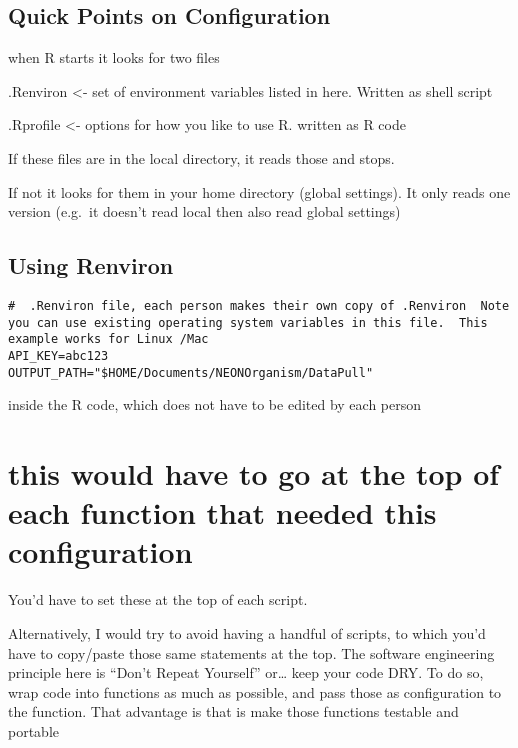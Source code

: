 \documentclass[
]{article}
\begin{document}
\hypertarget{quick-points-on-configuration}{%
\subsection{Quick Points on Configuration}\label{quick-points-on-configuration}}

when R starts it looks for two files

.Renviron \textless- set of environment variables listed in here. Written as shell script

.Rprofile \textless- options for how you like to use R. written as R code

If these files are in the local directory, it reads those and stops.

If not it looks for them in your home directory (global settings). It only reads one version (e.g.~it doesn't read local then also read global settings)

\hypertarget{using-renviron}{%
\subsection{Using Renviron}\label{using-renviron}}

\begin{verbatim}
#  .Renviron file, each person makes their own copy of .Renviron  Note you can use existing operating system variables in this file.  This example works for Linux /Mac 
API_KEY=abc123
OUTPUT_PATH="$HOME/Documents/NEONOrganism/DataPull"   
\end{verbatim}

inside the R code, which does not have to be edited by each person

\hypertarget{this-would-have-to-go-at-the-top-of-each-function-that-needed-this-configuration}{%
\section{this would have to go at the top of each function that needed this configuration}\label{this-would-have-to-go-at-the-top-of-each-function-that-needed-this-configuration}}

You'd have to set these at the top of each script.

Alternatively, I would try to avoid having a handful of scripts, to which you'd have to copy/paste those same statements at the top. The software engineering principle here is ``Don't Repeat Yourself'' or\ldots{} keep your code DRY. To do so, wrap code into functions as much as possible, and pass those as configuration to the function. That advantage is that is make those functions testable and portable
\end{document}
